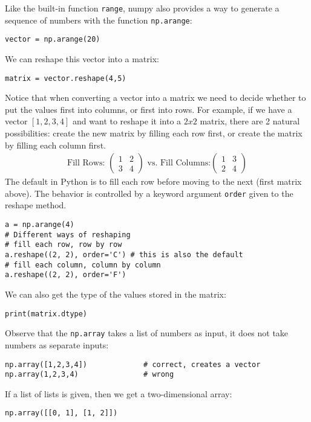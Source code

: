 \documentclass[12pt, a4paper]{article}
\begin{document}
Like the built-in function \texttt{range}, numpy also provides a way to generate a sequence of numbers with the function \texttt{np.arange}:
\lstset{language=jupyter-python,label= ,caption= ,captionpos=b,numbers=none}
\begin{lstlisting}
vector = np.arange(20)
\end{lstlisting}
We can reshape this vector into a matrix:
\lstset{language=jupyter-python,label= ,caption= ,captionpos=b,numbers=none}
\begin{lstlisting}
matrix = vector.reshape(4,5)
\end{lstlisting}
Notice that when converting a vector into a matrix we need to decide whether to put the values first into columns, or first into rows.
For example, if we have a vector \([1,2,3,4]\) and want to reshape it into a \(2x2\) matrix, there are 2 natural possibilities: create the new matrix by filling each row first, or create the matrix by filling each column first.
\begin{align*}
\text{Fill Rows: }\begin{pmatrix}
1 & 2\\
3 & 4
\end{pmatrix}\text{ vs. Fill Columns:}
\begin{pmatrix}
1 & 3\\
2 & 4
\end{pmatrix}
\end{align*}
The default in Python is to fill each row before moving to the next (first matrix above).
The behavior is controlled by a keyword argument \texttt{order} given to the reshape method.
\lstset{language=jupyter-python,label= ,caption= ,captionpos=b,numbers=none}
\begin{lstlisting}
a = np.arange(4)
# Different ways of reshaping
# fill each row, row by row
a.reshape((2, 2), order='C') # this is also the default
# fill each column, column by column
a.reshape((2, 2), order='F')
\end{lstlisting}
We can also get the type of the values stored in the matrix:
\lstset{language=jupyter-python,label= ,caption= ,captionpos=b,numbers=none}
\begin{lstlisting}
print(matrix.dtype)
\end{lstlisting}
Observe that the \texttt{np.array} takes a list of numbers as input, it does not take numbers as separate inputs:
\lstset{language=jupyter-python,label= ,caption= ,captionpos=b,numbers=none}
\begin{lstlisting}
np.array([1,2,3,4])             # correct, creates a vector
np.array(1,2,3,4)               # wrong
\end{lstlisting}
If a list of lists is given, then we get a two-dimensional array:
\lstset{language=jupyter-python,label= ,caption= ,captionpos=b,numbers=none}
\begin{lstlisting}
np.array([[0, 1], [1, 2]])
\end{lstlisting}
\end{document}
